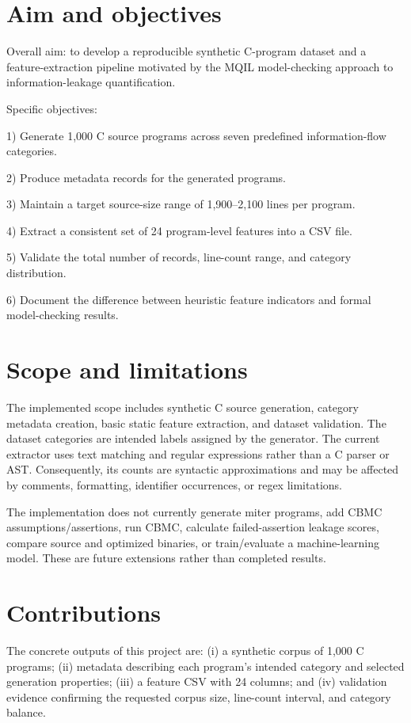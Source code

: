 \documentclass[12pt,a4paper,oneside]{report}
\begin{document}
\section{Aim and objectives}
Overall aim: to develop a reproducible synthetic C-program dataset and a feature-extraction pipeline motivated by the MQIL model-checking approach to information-leakage quantification.\par
Specific objectives:\par
1) Generate 1,000 C source programs across seven predefined information-flow categories.\par
2) Produce metadata records for the generated programs.\par
3) Maintain a target source-size range of 1,900--2,100 lines per program.\par
4) Extract a consistent set of 24 program-level features into a CSV file.\par
5) Validate the total number of records, line-count range, and category distribution.\par
6) Document the difference between heuristic feature indicators and formal model-checking results.\par

\section{Scope and limitations}
The implemented scope includes synthetic C source generation, category metadata creation, basic static feature extraction, and dataset validation. The dataset categories are intended labels assigned by the generator. The current extractor uses text matching and regular expressions rather than a C parser or AST. Consequently, its counts are syntactic approximations and may be affected by comments, formatting, identifier occurrences, or regex limitations.\par
The implementation does not currently generate miter programs, add CBMC assumptions/assertions, run CBMC, calculate failed-assertion leakage scores, compare source and optimized binaries, or train/evaluate a machine-learning model. These are future extensions rather than completed results.\par

\section{Contributions}
The concrete outputs of this project are: (i) a synthetic corpus of 1,000 C programs; (ii) metadata describing each program's intended category and selected generation properties; (iii) a feature CSV with 24 columns; and (iv) validation evidence confirming the requested corpus size, line-count interval, and category balance.\par
\end{document}
